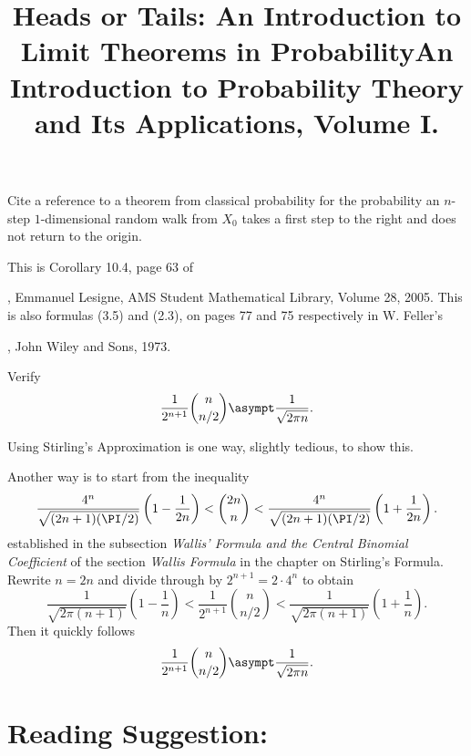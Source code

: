 \documentclass[12pt]{article}
\begin{document}
\begin{exercise}
    Cite a reference to a theorem from classical probability for the
    probability an \( n \)-step \( 1 \)-dimensional random walk from \(
    X_0 \) takes a first step to the right and does not return to the
    origin.
\end{exercise}
\begin{solution}
    This is Corollary 10.4, page 63 of
    \title{Heads or Tails:  An Introduction to Limit Theorems in
    Probability}, Emmanuel Lesigne, AMS Student Mathematical Library,
    Volume 28, 2005.  This is also formulas (3.5) and (2.3), on pages 77
    and 75 respectively in W. Feller's
    \title{An Introduction to Probability Theory and Its Applications,
    Volume I.}, John Wiley and Sons, 1973.
\end{solution}

\begin{exercise}
    Verify
    \[
        \frac{1}{2^{n+1}}\binom{n}{n/2} \asympt \frac{1}{\sqrt{2 \pi n}}.
    \]
\end{exercise}
\begin{solution}
    Using Stirling's Approximation is one way, slightly tedious, to show
    this.

    Another way is to start from the inequality
    \[
        \frac{4^n}{\sqrt{(2n+1)(\PI/2)}}\left(1-\frac{1}{2n} \right) < {\binom
        {2n}{n}} < \frac{4^n}{\sqrt{(2n+1)(\PI/2)}} \left(1 + \frac{1}{2n}
        \right).
    \] established in the subsection \emph{Wallis' Formula and the
    Central Binomial Coefficient} of the section \emph{Wallis Formula}
    in the chapter on Stirling's Formula.  Rewrite \( n = 2n \) and
    divide through by \( 2^{n + 1} = 2 \cdot 4^n \) to obtain
    \[
        \frac{1}{\sqrt{2\pi(n+1)}} \left( 1 - \frac{1}{n} \right) <
        \frac{1}{2^{n+1}} \binom{n}{n/2} < \frac{1}{\sqrt{2\pi(n+1)}}
        \left( 1 + \frac{1}{n} \right).
    \] Then it quickly follows
    \[
        \frac{1}{2^{n+1}}\binom{n}{n/2} \asympt \frac{1}{\sqrt{2 \pi n}}.
    \]
\end{solution}

\hr

\section*{Reading Suggestion:}


\end{document}
